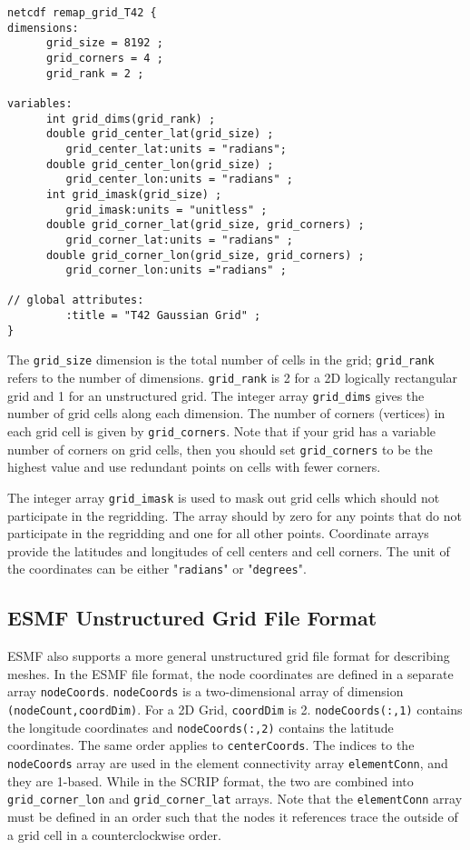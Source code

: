 \begin{verbatim}
netcdf remap_grid_T42 {
dimensions:
      grid_size = 8192 ;
      grid_corners = 4 ;
      grid_rank = 2 ;

variables:
      int grid_dims(grid_rank) ;
      double grid_center_lat(grid_size) ;
         grid_center_lat:units = "radians";
      double grid_center_lon(grid_size) ;
         grid_center_lon:units = "radians" ;
      int grid_imask(grid_size) ;
         grid_imask:units = "unitless" ;
      double grid_corner_lat(grid_size, grid_corners) ;
         grid_corner_lat:units = "radians" ;
      double grid_corner_lon(grid_size, grid_corners) ;
         grid_corner_lon:units ="radians" ;

// global attributes:
         :title = "T42 Gaussian Grid" ;
}
\end{verbatim}

The {\tt grid\_size} dimension is the total number of cells in the grid; {\tt grid\_rank} refers to the
number of dimensions. {\tt grid\_rank} is 2 for a 2D logically rectangular grid and 1 for an 
unstructured grid. The integer array {\tt grid\_dims} gives the number of grid cells along each dimension. 
The number of corners (vertices) in each grid cell is given by {\tt grid\_corners}.
Note that if your grid has a variable number of corners on grid cells, then
you should set {\tt grid\_corners} to be the highest value and use redundant points
on cells with fewer corners. 

The integer array {\tt grid\_imask} is used to mask out grid cells which should
not participate in the regridding. The array should by zero for any points
that do not participate in the regridding and one for all other points.
Coordinate arrays provide the latitudes and longitudes of cell centers
and cell corners. The unit of the coordinates can be either "{\tt radians}" or "{\tt degrees}". 

\subsection{ESMF Unstructured Grid File Format}\label{sec:application:esmfgridformat}

ESMF also supports a more general unstructured grid file format for describing meshes.
In the ESMF file format, the node coordinates are defined in a separate array
{\tt nodeCoords}. {\tt nodeCoords} is a two-dimensional array of dimension {\tt (nodeCount,coordDim)}.
For a 2D Grid, {\tt coordDim} is 2. {\tt nodeCoords(:,1)} contains the longitude coordinates and
{\tt nodeCoords(:,2)} contains the latitude coordinates.  The same order applies to {\tt centerCoords}.
 The indices to the {\tt nodeCoords} array are used in the element
connectivity array {\tt elementConn}, and they are 1-based. 
While in the SCRIP format, the two are combined into 
{\tt grid\_corner\_lon} and {\tt grid\_corner\_lat} arrays.  
Note that the {\tt elementConn} array must be defined in an order such that the nodes it references trace
the outside of a grid cell in a counterclockwise order.

